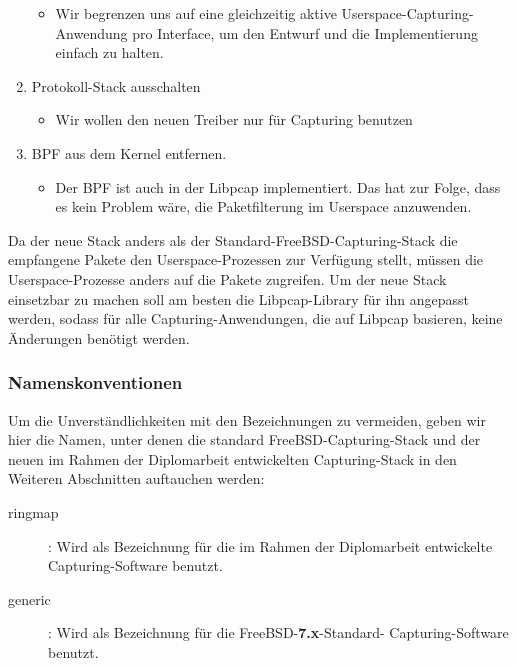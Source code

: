 \begin{enumerate}
		\begin{itemize}
			\item Wir begrenzen uns auf eine gleichzeitig aktive Userspace-Capturing-Anwendung
			      pro Interface, um den Entwurf und die Implementierung einfach zu halten.
		\end{itemize}
	\item Protokoll-Stack ausschalten 
		\begin{itemize}
			\item Wir wollen den neuen Treiber nur für Capturing benutzen
		\end{itemize}
	\item BPF aus dem Kernel entfernen. 
		\begin{itemize}
			\item Der BPF ist auch in der Libpcap implementiert. Das hat zur Folge, dass
				es kein Problem wäre, die Paketfilterung im Userspace anzuwenden.
		\end{itemize}
\end{enumerate}
Da der neue Stack anders als der Standard-FreeBSD-Capturing-Stack die empfangene Pakete den
Userspace-Prozessen zur Verfügung stellt, müssen die Userspace-Prozesse anders
auf die Pakete zugreifen. Um der neue Stack einsetzbar zu machen soll am besten
die Libpcap-Library für ihn angepasst werden, sodass für alle
Capturing-Anwendungen, die auf Libpcap basieren, keine Änderungen benötigt
werden. 

\subsubsection{Namenskonventionen}
Um die Unverständlichkeiten mit den Bezeichnungen zu vermeiden, geben wir 
hier die Namen, unter denen die standard FreeBSD-Capturing-Stack und 
der neuen im Rahmen der Diplomarbeit entwickelten Capturing-Stack in den 
Weiteren Abschnitten auftauchen werden: 
\begin{description}
	\item[ringmap]: Wird als Bezeichnung für die im Rahmen der Diplomarbeit 
		entwickelte Capturing-Software benutzt. 
	\item [generic]: Wird als Bezeichnung für die FreeBSD-\textbf{7.x}-Standard-
		Capturing-Software benutzt.
\end{description}



